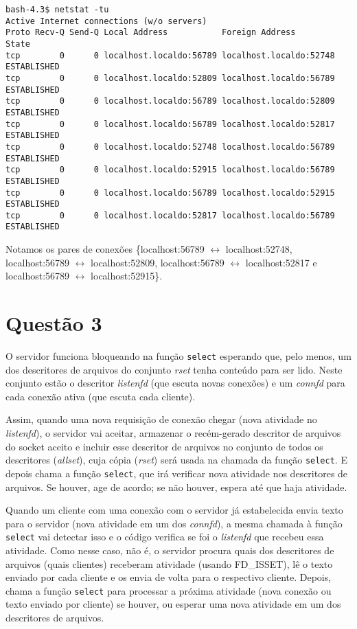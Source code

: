 \documentclass[a4paper,10pt]{article}
\begin{document}
\begin{lstlisting}
bash-4.3$ netstat -tu
Active Internet connections (w/o servers)
Proto Recv-Q Send-Q Local Address           Foreign Address         State      
tcp        0      0 localhost.localdo:56789 localhost.localdo:52748 ESTABLISHED
tcp        0      0 localhost.localdo:52809 localhost.localdo:56789 ESTABLISHED
tcp        0      0 localhost.localdo:56789 localhost.localdo:52809 ESTABLISHED
tcp        0      0 localhost.localdo:56789 localhost.localdo:52817 ESTABLISHED
tcp        0      0 localhost.localdo:52748 localhost.localdo:56789 ESTABLISHED
tcp        0      0 localhost.localdo:52915 localhost.localdo:56789 ESTABLISHED
tcp        0      0 localhost.localdo:56789 localhost.localdo:52915 ESTABLISHED
tcp        0      0 localhost.localdo:52817 localhost.localdo:56789 ESTABLISHED

\end{lstlisting}

Notamos os pares de conexões \{localhost:56789 $\leftrightarrow$ localhost:52748, localhost:56789 $\leftrightarrow$ localhost:52809, localhost:56789 $\leftrightarrow$ localhost:52817 e localhost:56789 $\leftrightarrow$ localhost:52915\}.

\section{Questão 3}
O servidor funciona bloqueando na função {\tt select} esperando que, pelo menos, um dos descritores de arquivos do conjunto \textit{rset} tenha conteúdo para ser lido. Neste conjunto estão o descritor \textit{listenfd} (que escuta novas conexões) e um \textit{connfd} para cada conexão ativa (que escuta cada cliente).

Assim, quando uma nova requisição de conexão chegar (nova atividade no \textit{listenfd}), o servidor vai aceitar, armazenar o recém-gerado descritor de arquivos do socket aceito e incluir esse descritor de arquivos no conjunto de todos os descritores (\textit{allset}), cuja cópia (\textit{rset}) será usada na chamada da função {\tt select}. E depois chama a função {\tt select}, que irá verificar nova atividade nos descritores de arquivos. Se houver, age de acordo; se não houver, espera até que haja atividade.

Quando um cliente com uma conexão com o servidor já estabelecida envia texto para o servidor (nova atividade em um dos \textit{connfd}), a mesma chamada à função {\tt select} vai detectar isso e o código verifica se foi o \textit{listenfd} que recebeu essa atividade. Como nesse caso, não é, o servidor procura quais dos descritores de arquivos (quais clientes) receberam atividade (usando FD\_ISSET), lê o texto enviado por cada cliente e os envia de volta para o respectivo cliente. Depois, chama a função {\tt select} para processar a próxima atividade (nova conexão ou texto enviado por cliente) se houver, ou esperar uma nova atividade em um dos descritores de arquivos.
\end{document}
